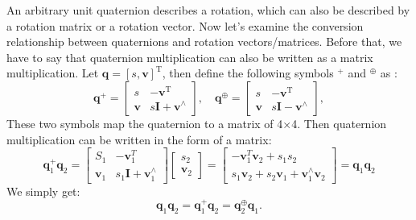 An arbitrary unit quaternion describes a rotation, which can also be described by a rotation matrix or a rotation vector. Now let's examine the conversion relationship between quaternions and rotation vectors/matrices. Before that, we have to say that quaternion multiplication can also be written as a matrix multiplication. Let $\mathbf{q}=[s,\mathbf{v}]^\mathrm{T}$, then define the following symbols $^{+}$ and $^{\oplus}$ as \cite{Barfoot2011}:
\begin{equation}
	\mathbf{q}^{+}=\left[\begin{array}{cc}
		s&-\mathbf{v}^\mathrm{T} \\
		\mathbf{v}&s\mathbf{I}+\mathbf{v}^{\wedge}
	\end{array}\right],\quad
	\mathbf{q}^{\oplus}=
	\left[\begin{array}{cc}
		s & -\mathbf{v}^\mathrm{T} \\
		\mathbf{v} & s\mathbf{I}-\mathbf{v}^{\wedge}
	\end{array}\right],
\end{equation}
These two symbols map the quaternion to a matrix of 4$\times$4. Then quaternion multiplication can be written in the form of a matrix:
\begin{equation}
	\mathbf{q}_1^ + {\mathbf{q}_2} = \left[ {\begin{array}{*{20}{c}}
			S_1&-\mathbf{v}_1^T\\
			\mathbf{v}_1 & s_1 \mathbf{I} + \mathbf{v}_1^\wedge
	\end{array}} \right]\left[ {\begin{array}{*{20}{c}}
			{{s _2}} \\
			{{\mathbf{v} _2}}
	\end{array}} \right] = \left[ {\begin{array}{*{20}{c}}
			{ - \mathbf{v} _1^T{\mathbf{v} _2} + {s _1}{s _2}} \\
			{{s _1}{\mathbf{v} _2} + {s _2}{\mathbf{v} _1} + \mathbf{v} _1^ \wedge {\mathbf{v} _2}}
	\end{array}} \right] = \mathbf{q}_1 \mathbf{q}_2
\end{equation}
We simply get:
\begin{equation}
	\mathbf{q}_1 \mathbf{q}_2 = \mathbf{q}_1^{+} \mathbf{q}_2 = \mathbf{q}_2^{\oplus} \mathbf{q}_1.
\end{equation}


